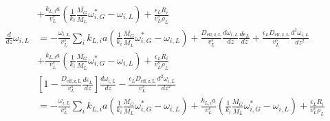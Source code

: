 \documentclass{article}
\begin{document}
\begin{equation}
\begin{split}
	&+ \frac{k_{L,i}a}{v_L^s}(\frac{1}{k_i}\frac{\overline{M_G}}{\overline{M_L}}\omega_{i,G}^*-\omega_{i,L}) + \frac{\epsilon_L R_i}{v_L^s\rho_L}\\
	\frac{d}{dz}\omega_{i,L}&= - \frac{\omega_{i,L}}{v_L^s}\sum_ik_{L,i}a(\frac{1}{k_i}\frac{\overline{M_G}}{\overline{M_L}}\omega_{i,G}^*-\omega_{i,L}) + \frac{D_{\mathrm{eff,z,L}}}{v_L^s}\frac{d\omega_{i,L}}{dz}\frac{d\epsilon_L}{dz} + \frac{\epsilon_L D_{\mathrm{eff,z,L}}}{v_L^s}\frac{d^2\omega_{i,L}}{dz^2} \\
	& + \frac{k_{L,i}a}{v_L^s}(\frac{1}{k_i}\frac{\overline{M_G}}{\overline{M_L}}\omega_{i,G}^*-\omega_{i,L}) + \frac{\epsilon_L R_i}{v_L^s\rho_L}\\
	&\left[1 -  \frac{D_{\mathrm{eff,z,L}}}{v_L^s}\frac{d\epsilon_L}{dz} \right]\frac{d\omega_{i,L}}{dz} - \frac{\epsilon_L D_{\mathrm{eff,z,L}}}{v_L^s}\frac{d^2\omega_{i,L}}{dz^2} \\
	&= - \frac{\omega_{i,L}}{v_L^s}\sum_ik_{L,i}a(\frac{1}{k_i}\frac{\overline{M_G}}{\overline{M_L}}\omega_{i,G}^*-\omega_{i,L}) + \frac{k_{L,i}a}{v_L^s}(\frac{1}{k_i}\frac{\overline{M_G}}{\overline{M_L}}\omega_{i,G}^*-\omega_{i,L}) + \frac{\epsilon_L R_i}{v_L^s\rho_L}
	\end{split}
	\label{eq:component_balance_liquid_minus_total_balance}
\end{equation} 
\end{document}
